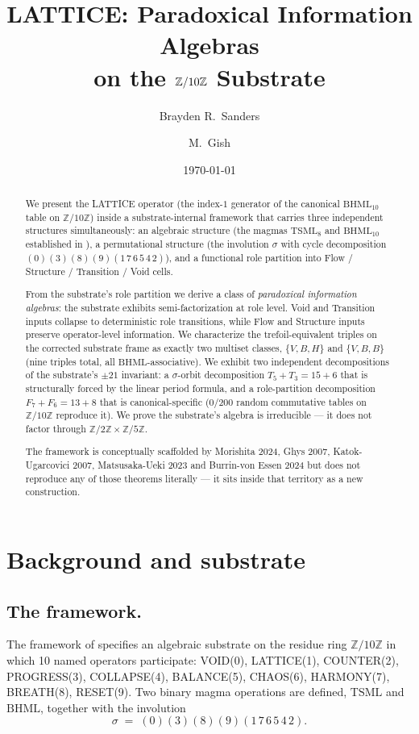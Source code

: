 \documentclass[11pt,reqno]{amsart}
\title[Paradoxical Information Algebras on $\Z/10\Z$]
{LATTICE: Paradoxical Information Algebras \\
 on the $\Z/10\Z$ Substrate}
\author{Brayden R.\ Sanders \and M.\ Gish}
\date{\today}
\theoremstyle{plain}
\theoremstyle{definition}
\theoremstyle{remark}
\newcommand{\Z}{\mathbb{Z}}
\newcommand{\TS}{\mathrm{TSML}}
\newcommand{\BH}{\mathrm{BHML}}
\newcommand{\sig}{\sigma}
\begin{document}
\begin{abstract}
We present the LATTICE operator (the index-$1$ generator of the
canonical $\BH_{10}$ table on $\Z/10\Z$) inside a substrate-internal
framework that carries three independent structures simultaneously:
an algebraic structure (the magmas $\TS_{8}$ and $\BH_{10}$
established in \cite{SandersGishFourCore}), a permutational structure
(the involution $\sig$ with cycle decomposition
$(0)(3)(8)(9)(1\,7\,6\,5\,4\,2)$), and a functional role partition
into Flow / Structure / Transition / Void cells.

From the substrate's role partition we derive a class of
\emph{paradoxical information algebras}: the substrate exhibits
semi-factorization at role level. Void and Transition inputs collapse
to deterministic role transitions, while Flow and Structure inputs
preserve operator-level information. We characterize the
trefoil-equivalent triples on the corrected substrate frame as exactly
two multiset classes, $\{V, B, H\}$ and $\{V, B, B\}$ (nine triples
total, all $\BH$-associative). We exhibit two independent
decompositions of the substrate's $\pm 21$ invariant: a $\sig$-orbit
decomposition $T_{5} + T_{3} = 15 + 6$ that is structurally forced by
the linear period formula, and a role-partition decomposition
$F_{7} + F_{6} = 13 + 8$ that is canonical-specific
(0/200 random commutative tables on $\Z/10\Z$ reproduce it). We prove
the substrate's algebra is irreducible --- it does not factor through
$\Z/2\Z \times \Z/5\Z$.

The framework is conceptually scaffolded by Morishita 2024, Ghys 2007,
Katok-Ugarcovici 2007, Matsusaka-Ueki 2023 and Burrin-von Essen 2024
but does not reproduce any of those theorems literally --- it sits
inside that territory as a new construction.
\end{abstract}

\maketitle

\tableofcontents

\section{Background and substrate}

\subsection{The framework.}
The framework of \cite{SandersGishFourCore} specifies an algebraic
substrate on the residue ring $\Z/10\Z$ in which 10 named operators
participate: VOID(0), LATTICE(1), COUNTER(2), PROGRESS(3), COLLAPSE(4),
BALANCE(5), CHAOS(6), HARMONY(7), BREATH(8), RESET(9). Two binary
magma operations are defined, $\TS$ and $\BH$, together with the
involution
\[
  \sig \;=\; (0)(3)(8)(9)(1\,7\,6\,5\,4\,2).
\]
\end{document}
